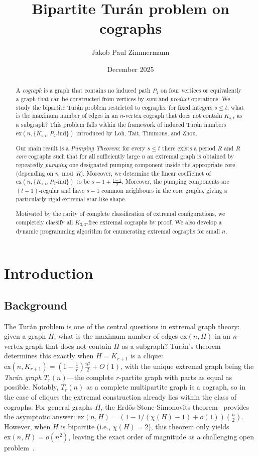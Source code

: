 \documentclass{article}
\title{Bipartite Turán problem on cographs}
\author{Jakob Paul Zimmermann}
\date{December 2025}
\theoremstyle{definition}
\theoremstyle{definition}
\theoremstyle{definition}
\theoremstyle{definition}
\theoremstyle{definition}
\theoremstyle{definition}
\theoremstyle{definition}
\theoremstyle{definition}
\theoremstyle{definition}
\theoremstyle{definition}
\begin{document}
\maketitle

\begin{abstract}
A \emph{cograph} is a graph that contains no induced path $P_4$ on four vertices or equivalently a graph that can be constructed from vertices by \emph{sum} and \emph{product} operations.
We study the bipartite Tur\'an problem restricted to cographs: for fixed integers $s \leq t$, what is the maximum number of edges in an $n$-vertex cograph that does not contain $K_{s,t}$ as a subgraph?
This problem falls within the framework of induced Tur\'an numbers $\text{ex}(n, \{K_{s,t}, P_4\text{-ind}\})$ introduced by Loh, Tait, Timmons, and Zhou.

Our main result is a \emph{Pumping Theorem}: for every $s\le t$ there exists a period $R$ and $R$ \emph{core} cographs such that for all sufficiently large $n$ an extremal graph is obtained by repeatedly \emph{pumping} one designated pumping component inside the appropriate core (depending on $n\bmod R$). Moreover, we determine the linear coefficinet of $\text{ex}(n, \{K_{s,t}, P_4\text{-ind}\})$ to be $s-1 + \frac{t-1}{2}$. Moreover, the pumping components are $(t-1)$-regular and have $s-1$ common neighbours in the core graphs, giving a particularly rigid extremal star-like shape.

Motivated by the rarity of complete classification of extremal configurations, we completely classify all $K_{3,3}$-free extremal cographs by proof. We also develop a dynamic programming algorithm for enumerating extremal cographs for small $n$.
\end{abstract}

\section{Introduction}

\subsection{Background}

The Tur\'an problem is one of the central questions in extremal graph theory: given a graph $H$, what is the maximum number of edges $\text{ex}(n, H)$ in an $n$-vertex graph that does not contain $H$ as a subgraph?
Tur\'an's theorem~\cite{Shapira2016} determines this exactly when $H = K_{r+1}$ is a clique: $\text{ex}(n, K_{r+1}) = \left(1 - \frac{1}{r}\right)\frac{n^2}{2} + O(1)$, with the unique extremal graph being the \emph{Tur\'an graph} $T_r(n)$---the complete $r$-partite graph with parts as equal as possible.
Notably, $T_r(n)$ as a complete multipartite graph is a cograph, so in the case of cliques the extremal construction already lies within the class of cographs.
For general graphs $H$, the Erd\H{o}s-Stone-Simonovits theorem~\cite{Shapira2016} provides the asymptotic answer: $\text{ex}(n, H) = (1 - 1/(\chi(H)-1) + o(1)) \binom{n}{2}$.
However, when $H$ is bipartite (i.e., $\chi(H) = 2$), this theorem only yields $\text{ex}(n, H) = o(n^2)$, leaving the exact order of magnitude as a challenging open problem~\cite{Furedi2013}.
\end{document}
